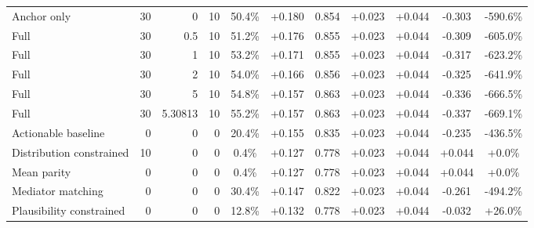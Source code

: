 \begin{table}[htbp]
\begin{tabular}{lrrrccccccc}
Anchor only & 30 & 0 & 10 & 50.4\% & +0.180 & 0.854 & +0.023 & +0.044 & -0.303 & -590.6\% \\
Full & 30 & 0.5 & 10 & 51.2\% & +0.176 & 0.855 & +0.023 & +0.044 & -0.309 & -605.0\% \\
Full & 30 & 1 & 10 & 53.2\% & +0.171 & 0.855 & +0.023 & +0.044 & -0.317 & -623.2\% \\
Full & 30 & 2 & 10 & 54.0\% & +0.166 & 0.856 & +0.023 & +0.044 & -0.325 & -641.9\% \\
Full & 30 & 5 & 10 & 54.8\% & +0.157 & 0.863 & +0.023 & +0.044 & -0.336 & -666.5\% \\
Full & 30 & 5.30813 & 10 & 55.2\% & +0.157 & 0.863 & +0.023 & +0.044 & -0.337 & -669.1\% \\
Actionable baseline & 0 & 0 & 0 & 20.4\% & +0.155 & 0.835 & +0.023 & +0.044 & -0.235 & -436.5\% \\
Distribution constrained & 10 & 0 & 0 & 0.4\% & +0.127 & 0.778 & +0.023 & +0.044 & +0.044 & +0.0\% \\
Mean parity & 0 & 0 & 0 & 0.4\% & +0.127 & 0.778 & +0.023 & +0.044 & +0.044 & +0.0\% \\
Mediator matching & 0 & 0 & 0 & 30.4\% & +0.147 & 0.822 & +0.023 & +0.044 & -0.261 & -494.2\% \\
Plausibility constrained & 0 & 0 & 0 & 12.8\% & +0.132 & 0.778 & +0.023 & +0.044 & -0.032 & +26.0\% \\
\bottomrule
\end{tabular}
\end{table}